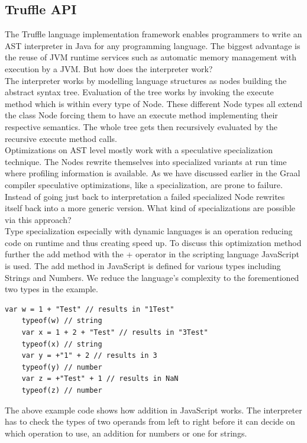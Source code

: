 \subsection{Truffle API}
The Truffle language implementation framework enables programmers to write an AST interpreter in Java for any programming language. The biggest advantage is the reuse of JVM runtime services such as automatic memory management with execution by a JVM. But how does the interpreter work?\\
The interpreter works by modelling language structures as nodes building the abstract syntax tree. Evaluation of the tree works by invoking the execute method which is within every type of Node. These different Node types all extend the class Node forcing them to have an execute method implementing their respective semantics. The whole tree gets then recursively evaluated by the recursive execute method calls.\\
Optimizations on AST level mostly work with a speculative specialization technique. The Nodes rewrite themselves into specialized variants at run time where profiling information is available. \cite{wuerthSelf} As we have discussed earlier in the Graal compiler speculative optimizations, like a specialization, are prone to failure. Instead of going just back to interpretation a failed specialized Node rewrites itself back into a more generic version. What kind of specializations are possible via this approach?\\
Type specialization especially with dynamic languages is an operation reducing code on runtime and thus creating speed up. To discuss this optimization method further the add method with the + operator in the scripting language JavaScript is used. The add method in JavaScript is defined for various types including Strings and Numbers. We reduce the language's complexity to the forementioned two types in the example.\\
\begin{lstlisting}[caption=JavaScript addition types minimal example]
	var w = 1 + "Test" // results in "1Test"
	typeof(w) // string
	var x = 1 + 2 + "Test" // results in "3Test"
	typeof(x) // string
	var y = +"1" + 2 // results in 3
	typeof(y) // number
	var z = +"Test" + 1 // results in NaN
	typeof(z) // number
\end{lstlisting}
The above example code shows how addition in JavaScript works. The interpreter has to check the types of two operands from left to right before it can decide on which operation to use, an addition for numbers or one for strings.\\
